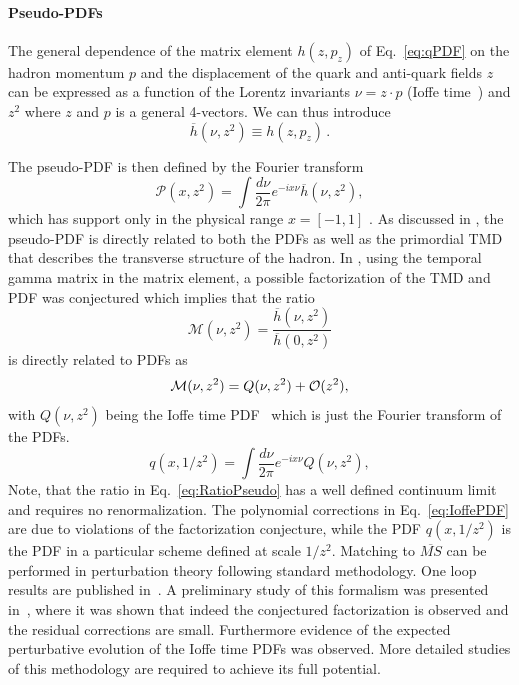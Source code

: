 



\paragraph*{Pseudo-PDFs} 
The general dependence of the  matrix element $h(z,p_z)$ of Eq.~\eqref{eq:qPDF} on the hadron momentum $p$ and the displacement of the quark and anti-quark fields $z$ can be expressed as a function of the Lorentz invariants $\nu = z\cdot p$  (Ioffe time~\cite{Ioffe:1969kf,Braun:1994jq}) and $z^2$ where $z$  and $p$ is a general 4-vectors.  We can thus introduce
\begin{equation}
\overline{h}(\nu,z^2) \equiv h(z,p_z)\,.
\end{equation}

The pseudo-PDF is then defined
by the Fourier transform
\begin{equation}
{\mathcal P}(x,z^2)=\int \frac{d\nu}{2\pi} e^{-ix\nu} \overline{h}(\nu,z^2),
\end{equation}
which has support only in the physical range $x = [-1,1]$ \cite{Radyushkin:2016hsy,Radyushkin:2017cyf}. 
As discussed in  \cite{Radyushkin:2016hsy,Radyushkin:2017cyf}, the pseudo-PDF is directly related to both the PDFs as well as the primordial TMD that describes the transverse structure of the hadron.
In  \cite{Radyushkin:2017cyf}, using the temporal gamma matrix in the matrix element, a possible factorization of the TMD and PDF was conjectured which implies that the ratio
\begin{equation}
{\mathcal M}(\nu,z^2) =\frac{\overline h(\nu,z^2)}{\overline h(0,z^2)}
\label{eq:RatioPseudo}
\end{equation}
is directly related to PDFs as 
\begin{equation}
{\mathcal M}(\nu,z^2) =Q(\nu,z^2) + {\cal O}(z^2),
\label{eq:IoffePDF}
\end{equation}
with $Q(\nu,z^2)$ being the Ioffe time PDF~\cite{Ioffe:1969kf,Braun:1994jq} which is just the Fourier transform of the PDFs.
\begin{equation}
{q}(x,1/z^2)=\int \frac{d\nu}{2\pi} e^{-ix\nu} Q(\nu,z^2),
\end{equation}
Note, that the ratio in Eq.~\ref{eq:RatioPseudo} has a well defined continuum limit and requires no renormalization. 
The polynomial corrections in Eq.~\ref{eq:IoffePDF} are due to violations of the factorization conjecture, while the 
PDF ${q}(x,1/z^2)$ is the PDF in a particular scheme defined at scale $1/z^2$. Matching to $\overline{MS}$ can be performed in perturbation theory following standard methodology. One loop results are published in~\cite{Ji:2017rah}.
A preliminary study of this formalism was presented in~\cite{Orginos:2017kos}, where it was shown that indeed the conjectured factorization is observed and the residual corrections are small. Furthermore  evidence of the expected perturbative evolution of the Ioffe time PDFs was observed. More detailed studies of this methodology are required to achieve its full potential.  
